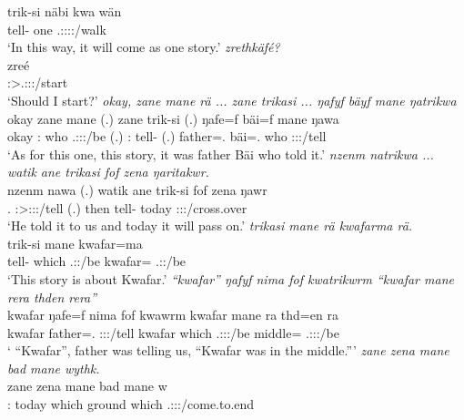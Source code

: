 \begin{exe}
	\gll trik-si näbi kwa wän\\ 
	tell-{\Nmlz} one {\Fut} \Tsg.\F:\Sbj:\Nonpast:\Ipfv:\Venit/walk\\
	\trans `In this way, it will come as one story.'
	\emph{zrethkäfé?}\\
	\gll zreé\\ 
	\Fsg:\Sbj>\Tsg.\F:\Obj:\Irr:\Pfv/start\\
	\trans `Should I start?'
\newpage 	
{} 
	\emph{okay, zane mane rä ... zane trikasi ... ŋafyf bäyf mane ŋatrikwa}\\
	\gll okay zane mane  (.) zane trik-si (.) ŋafe=f bäi=f mane ŋawa\\ 
	okay \Dem:{\Prox} who \Tsg.\F:\Sbj:\Nonpast:\Ipfv/be (.) \Dem:{\Prox} tell-{\Nmlz} (.) father=\Erg.{\Sg} bäi=\Erg.{\Sg} who \Sg:\Sbj:\Pst:\Ipfv/tell\\
	\trans `As for this one, this story, it was father Bäi who told it.'
	\emph{nzenm natrikwa ... watik ane trikasi fof zena ŋaritakwr.}\\
	\gll nzenm nawa (.) watik ane trik-si fof zena ŋawr\\ 
	\Fnsg.{\Dat} \Sg:\Sbj>\Fpl:\Io:\Pst:\Ipfv/tell (.) then {\Dem} tell-{\Nmlz} {\Emph} today \Stsg:\Sbj:\Nonpast:\Ipfv/cross.over\\
	\trans `He told it to us and today it will pass on.'
	\emph{trikasi mane rä kwafarma rä.}\\
	\gll trik-si mane  kwafar=ma \\ 
	tell-{\Nmlz} which \Tsg.\F:\Nonpast:\Ipfv/be kwafar={\Char} \Tsg.\F:\Nonpast:\Ipfv/be\\
	\trans `This story is about Kwafar.'
	\emph{``kwafar'' ŋafyf nima fof kwatrikwrm ``kwafar mane rera thden rera''}\\
	\gll kwafar ŋafe=f nima fof kwawrm kwafar mane ra thd=en ra\\ 
	kwafar father=\Erg.{\Sg} {\Quot} {\Emph} \Sg:\Sbj:\Pst:\Dur/tell kwafar which \Tsg.\F:\Sbj:\Pst:\Ipfv/be middle={\Loc} \Tsg.\F:\Sbj:\Pst:\Ipfv/be\\
	\trans ` ``Kwafar'', father was telling us, ``Kwafar was in the middle.'''
	\emph{zane zena mane bad mane wythk.}\\
	\gll zane zena mane bad mane w\\ 
	\Dem:{\Prox} today which ground which \Tsg.\F:\Sbj:\Nonpast:\Ipfv/come.to.end\\

\end{exe}
